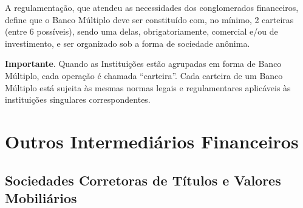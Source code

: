 \documentclass{article}\usepackage[]{graphicx}\usepackage[]{xcolor}
\begin{document}
A regulamentação, que atendeu as necessidades dos conglomerados financeiros, define que o Banco Múltiplo deve
ser constituído com, no mínimo, 2 carteiras (entre 6 possíveis), sendo uma delas, obrigatoriamente, comercial
e/ou de investimento, e ser organizado sob a forma de sociedade anônima.\par


\begin{table}[H]
\centering
\caption{Instituições Financeiras que podem ser agrupadas para formar um Banco Múltiplo.}
\end{table}


\textbf{Importante}. Quando as Instituições estão agrupadas em forma de Banco Múltiplo, cada operação é chamada
\enquote{carteira}. Cada carteira de um Banco Múltiplo está sujeita às mesmas normas legais e regulamentares
aplicáveis às instituições singulares correspondentes.\par

\section*{Outros Intermediários Financeiros}

\subsection*{Sociedades Corretoras de Títulos e Valores Mobiliários}
\end{document}
